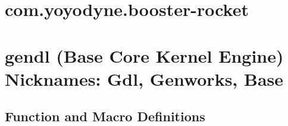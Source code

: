 \documentclass [11pt]{book}
\begin{document}
\section{com.yoyodyne.booster-rocket }

\label{sec:com.yoyodyne.booster-rocket}







\section{gendl (Base Core Kernel Engine) Nicknames: Gdl, Genworks, Base}

\label{sec:gendl(basecorekernelengine)nicknames:gdl,genworks,base}





\subsection{Function and Macro Definitions}

\label{subsec:functionandmacrodefinitions}
\end{document}
